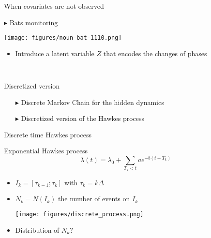 \documentclass[french,english]{beamer}
\begin{document}
\begin{frame}{When covariates are not observed}
\begin{minipage}{5cm}
     $\blacktriangleright$ Bats monitoring  
\end{minipage}
\begin{minipage}{5cm}
     \texttt{[image: figures/noun-bat-1110.png]}   
\end{minipage}

       
    \begin{itemize}
        \item Introduce a latent variable $Z$ that encodes the changes of phases
    \end{itemize}

\small 
\begin{figure}
   \begin{centering}
\
\end{centering}
\end{figure}

\begin{block}{Discretized version}
      \begin{itemize}
            \item[$\blacktriangleright$] Discrete Markov Chain for the hidden dynamics
             \item[$\blacktriangleright$]   Discretized version of the Hawkes process
        \end{itemize}
\end{block}
       
        
\end{frame}




\begin{frame}{Discrete time Hawkes process}
\small
\vspace{-0.2cm}
\begin{block}{Exponential Hawkes process}
$$\lambda(t)=\lambda_0 + \underset{T_k < t}{\sum} a e^{-b(t-T_k)} $$    
\end{block}
\begin{itemize}
    \item $I_k=[ \tau_{k-1};\tau_k]$ with $\tau_k=k\Delta$
    \item $N_k=N(I_k)$ the number of events on $I_k$


\vspace{-0.2cm}
\begin{center}
\texttt{[image: figures/discrete\_process.png]}
\end{center}

\vspace{-0.3cm}

\item Distribution of $N_k$?
\end{itemize}



\end{frame}
\end{document}
